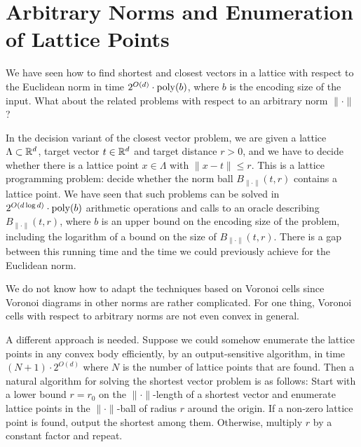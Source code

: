 %
%
%

\chapter{Arbitrary Norms and Enumeration of Lattice Points}

We have seen how to find shortest and closest vectors in a lattice
with respect to the Euclidean norm in time $2^{O(d)} \cdot \operatorname{poly}(b)$,
where $b$ is the encoding size of the input.
What about the related problems with respect to an arbitrary norm $\|\cdot\|$?

In the decision variant of the closest vector problem,
we are given a lattice $\Lambda \subset \mathbb{R}^d$,
target vector $t \in \mathbb{R}^d$
and target distance $r > 0$,
and we have to decide whether there is a lattice point $x \in \Lambda$
with $\|x - t\| \leq r$.
This is a lattice programming problem:
decide whether the norm ball $B_{\|\cdot\|}(t,r)$ contains a lattice point.
We have seen that such problems can be solved in
$2^{O(d \log d)} \cdot \operatorname{poly}(b)$ arithmetic operations
and calls to an oracle describing $B_{\|\cdot\|}(t,r)$,
where $b$ is an upper bound on the encoding size of the problem,
including the logarithm of a bound on the size of $B_{\|\cdot\|}(t,r)$.
There is a gap between this running time and
the time we could previously achieve for the Euclidean norm.

We do not know how to adapt the techniques based on Voronoi cells
since Voronoi diagrams in other norms are rather complicated.
For one thing, Voronoi cells with respect to arbitrary norms are not even convex in general.

A different approach is needed.
Suppose we could somehow enumerate the lattice points in any convex body efficiently,
by an output-sensitive algorithm,
in time $(N+1)\cdot 2^{O(d)}$
where $N$ is the number of lattice points that are found.
Then a natural algorithm for solving the shortest vector problem is as follows:
Start with a lower bound $r = r_0$ on the $\|\cdot\|$-length of a shortest vector
and enumerate lattice points in the $\|\cdot\|$-ball of radius $r$ around the origin.
If a non-zero lattice point is found, output the shortest among them.
Otherwise, multiply $r$ by a constant factor and repeat.

